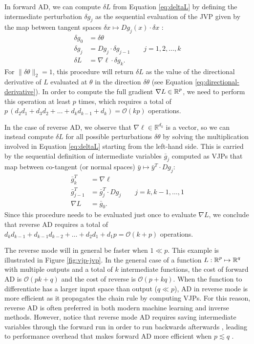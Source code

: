 In forward AD, we can compute $\delta L$ from Equation \eqref{eq:deltaL} by defining the intermediate perturbation $\delta g_j$ as the sequential evaluation of the JVP given by the map between tangent spaces $\delta x \mapsto Dg_j (x) \cdot \delta x$ \cite{Griewank:2008kh}:
\begin{align}
    \delta g_0 &= \delta \theta \\
    \delta g_j &= D g_j \cdot \delta g_{j-1} \qquad j = 1, 2, \ldots, k \\
    \delta L &= \nabla \ell \cdot \delta g_{k}.
\end{align}
For $\| \delta \theta \|_2 = 1$, this procedure will return $\delta L$ as the value of the directional derivative of $L$ evaluated at $\theta$ in the direction $\delta \theta$ (see Equation \eqref{eq:directional-derivative}). 
In order to compute the full gradient $\nabla L \in \operatorname{\mathbb{R}}^p$, we need to perform this operation at least $p$ times, which requires a total of $p \, (d_2 d_1 + d_3 d_2 + \ldots + d_k d_{k-1} + d_k )= \mathcal O (kp)$ operations.

In the case of reverse AD, we observe that $\nabla \ell \in \mathbb R^{d_k}$ is a vector, so we can instead compute $\delta L$ for all possible perturbations $\delta \theta$ by solving the multiplication involved in Equation \eqref{eq:deltaL} starting from the left-hand side. 
This is carried by the sequential definition of intermediate variables $\bar g_j$ computed as VJPs that map between co-tangent (or normal spaces) $\bar y \mapsto \bar y^T \cdot Dg_j$:
\begin{align}
    \bar g_{k}^T &= \nabla \ell \\
    \bar g_{j-1}^T &= \bar g_{j}^T \cdot Dg_j \qquad j = k, k-1, \ldots, 1 \\
    \nabla L &= \bar g_0.
\end{align}
Since this procedure needs to be evaluated just once to evaluate $\nabla L$, we conclude that reverse AD requires a total of $ d_k d_{k-1} + d_{k-1} d_{k-2} + \ldots + d_2 d_1 + d_1 p = \mathcal O (k+p)$ operations. 

The reverse mode will in general be faster when $1 \ll p$. 
This example is illustrated in Figure \ref{fig:vjp-jvp}. 
In the general case of a function $L : \operatorname{\mathbb{R}}^p \mapsto \operatorname{\mathbb{R}}^q$ with multiple outputs and a total of $k$ intermediate functions, the cost of forward AD is $\mathcal O (pk + q)$ and the cost of reverse is $\mathcal O (p + kq)$.
When the function to differentiate has a larger input space than output ($q \ll p$), AD in reverse mode is more efficient as it propagates the chain rule by computing VJPs.
For this reason, reverse AD is often preferred in both modern machine learning and inverse methods.
However, notice that reverse mode AD requires saving intermediate variables through the forward run in order to run backwards afterwards \cite{Bennett_1973}, leading to performance overhead that makes forward AD more efficient when $p \lesssim q$ \cite{Griewank_1989, Margossian_2018, Baydin_Pearlmutter_Radul_Siskind_2015}. 

